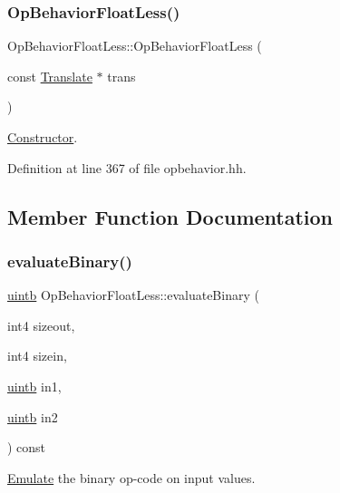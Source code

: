 \subsubsection{\texorpdfstring{OpBehaviorFloatLess()}{OpBehaviorFloatLess()}}
{\footnotesize\ttfamily Op\+Behavior\+Float\+Less\+::\+Op\+Behavior\+Float\+Less (\begin{DoxyParamCaption}\item[{const \mbox{\hyperlink{class_translate}{Translate}} $\ast$}]{trans }\end{DoxyParamCaption})\hspace{0.3cm}{\ttfamily [inline]}}



\mbox{\hyperlink{class_constructor}{Constructor}}. 



Definition at line 367 of file opbehavior.\+hh.



\subsection{Member Function Documentation}
\mbox{\label{class_op_behavior_float_less_aebfcafcb2f22f7d30a4df0999b248b4f}} 
\subsubsection{\texorpdfstring{evaluateBinary()}{evaluateBinary()}}
{\footnotesize\ttfamily \mbox{\hyperlink{types_8h_a2db313c5d32a12b01d26ac9b3bca178f}{uintb}} Op\+Behavior\+Float\+Less\+::evaluate\+Binary (\begin{DoxyParamCaption}\item[{int4}]{sizeout,  }\item[{int4}]{sizein,  }\item[{\mbox{\hyperlink{types_8h_a2db313c5d32a12b01d26ac9b3bca178f}{uintb}}}]{in1,  }\item[{\mbox{\hyperlink{types_8h_a2db313c5d32a12b01d26ac9b3bca178f}{uintb}}}]{in2 }\end{DoxyParamCaption}) const\hspace{0.3cm}{\ttfamily [virtual]}}



\mbox{\hyperlink{class_emulate}{Emulate}} the binary op-\/code on input values. 


